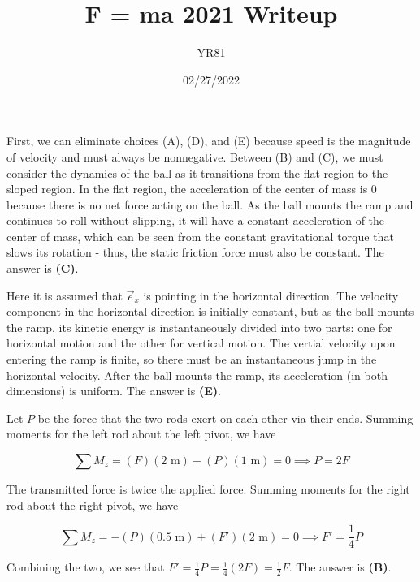 \documentclass[12pt]{article}
\title{F = ma 2021 Writeup}
\author{YR81}
\date{02/27/2022}
\begin{document}
\maketitle



First, we can eliminate choices (A), (D), and (E) because speed is the magnitude of velocity and must always be nonnegative. Between (B) and (C), we must consider the dynamics of the ball as it transitions from the flat region to the sloped region. In the flat region, the acceleration of the center of mass is $0$ because there is no net force acting on the ball. As the ball mounts the ramp and continues to roll without slipping, it will have a constant acceleration of the center of mass, which can be seen from the constant gravitational torque that slows its rotation - thus, the static friction force must also be constant. The answer is \textbf{(C)}. 


\vspace{2 \baselineskip}



Here it is assumed that $\vec{e}_x$ is pointing in the horizontal direction. The velocity component in the horizontal direction is initially constant, but as the ball mounts the ramp, its kinetic energy is instantaneously divided into two parts: one for horizontal motion and the other for vertical motion. The vertial velocity upon entering the ramp is finite, so there must be an instantaneous jump in the horizontal velocity. After the ball mounts the ramp, its acceleration (in both dimensions) is uniform. The answer is \textbf{(E)}.


\vspace{2 \baselineskip}



Let $P$ be the force that the two rods exert on each other via their ends. Summing moments for the left rod about the left pivot, we have

$$\sum M_z = (F) (2 \text{ m}) - (P) (1 \text{ m}) = 0 \implies P = 2 F$$

The transmitted force is twice the applied force. Summing moments for the right rod about the right pivot, we have

$$\sum M_z = - (P) (0.5 \text{ m}) + (F') (2 \text{ m}) = 0 \implies F' = \frac{1}{4} P$$

Combining the two, we see that $F' = \frac{1}{4} P = \frac{1}{4} (2 F) = \frac{1}{2} F$. The answer is \textbf{(B)}.
\end{document}
